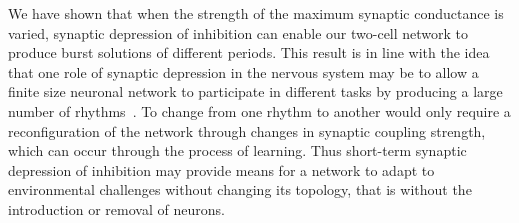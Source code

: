 We have shown that when the strength of the maximum synaptic conductance is varied, synaptic depression of inhibition can enable our two-cell network to produce burst solutions of different periods. This result is in line with the idea that one role of synaptic depression in the nervous system may be to allow a finite size neuronal network to participate in different tasks by producing a large number of rhythms~\citep{bose2011, jalil2004, li2007}. To change from one rhythm to another would only require a reconfiguration of the network through changes in synaptic coupling strength, which can occur through the process of learning. Thus short-term synaptic depression of inhibition may provide means for a network to adapt to environmental challenges without changing its topology, that is without the introduction or removal of neurons.
